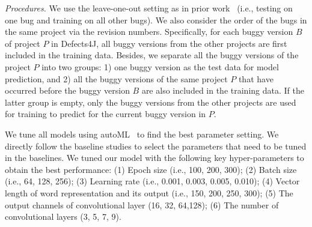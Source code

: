 \vspace{1pt}
\emph{Procedures.}
We use the leave-one-out setting as in prior work~\cite{DeepFL,TraPT}
(i.e., testing on one bug and training on all other bugs).
We also consider the order of the bugs in the same project via the
revision numbers. Specifically, for each buggy version $B$ of project
$P$ in Defects4J, all buggy versions from the other projects are first
included in the training data. Besides, we separate all the buggy
versions of the project $P$ into two groups: 1) one buggy version as
the test data for model prediction, and 2) all the buggy versions
of the same project $P$ that have occurred before the buggy version
$B$ are also included in the training data. If the latter group is
empty, only the buggy versions from the other projects are used for
training to predict for the current buggy version in $P$.








We tune all models using autoML~\cite{NNI} to find the best parameter
setting. We directly follow the baseline studies to select the
parameters that need to be tuned in the baselines.
We tuned our model with the following key hyper-parameters to obtain
the best performance: (1) Epoch size (i.e., 100, 200, 300); (2) Batch
size (i.e., 64, 128, 256); (3) Learning rate (i.e., 0.001, 0.003,
0.005, 0.010); (4) Vector length of word representation and its output
(i.e., 150, 200, 250, 300); (5) The output channels of convolutional
layer (16, 32, 64,128); (6) The number of convolutional layers (3, 5,
7, 9).


